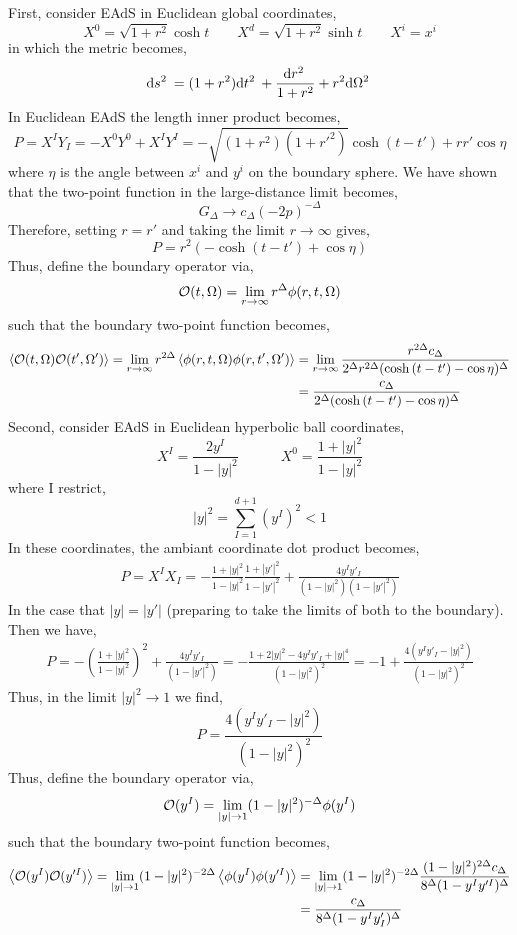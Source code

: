 \documentclass[12pt]{article}
\begin{document}
First, consider EAdS in Euclidean global coordinates,
\[ X^0 = \sqrt{1 + r^2} \cosh{t} \quad \quad X^d = \sqrt{1 + r^2} \sinh{t} \quad \quad X^i = x^i \]
in which the metric becomes,
\[ \mathrm{d}s^2 \: = (1 + r^2) \mathrm{d}t^2 \: + \frac{\mathrm{d}r^2 \:}{1 + r^2} + r^2 \mathrm{d}\Omega^2 \: \]
In Euclidean EAdS the length inner product becomes,
\[ P = X^I Y_I = - X^0 Y^0 + X^I Y^I = -\sqrt{(1 + r^2)(1 + r'^2)}  \cosh{(t - t')} + r r' \cos{\eta} \]
where $\eta$ is the angle between $x^i$ and $y^i$ on the boundary sphere.  
We have shown that the two-point function in the large-distance limit becomes,
\[ G_\Delta \to c_\Delta (-2 p)^{-\Delta} \]
Therefore, setting $r = r'$ and taking the limit $r \to \infty$ gives,
\[ P = r^2 \left( -\cosh{(t - t')} + \cos{\eta} \right) \]
Thus, define the boundary operator via,
\begin{align*}
\mathcal{O}(t, \Omega) = \lim_{r \to \infty} r^{\Delta} \phi(r, t, \Omega)
\end{align*}
such that the boundary two-point function becomes,
\begin{align*}
\left< \mathcal{O}(t, \Omega) \mathcal{O}(t', \Omega') \right> = \lim_{r \to \infty} r^{2\Delta} \left<  \phi(r, t, \Omega) \phi(r, t', \Omega') \right> & = \lim_{r \to \infty} \frac{r^{2\Delta} c_\Delta}{2^{\Delta} r^{2 \Delta} (\cosh{(t - t')} - \cos{\eta})^{\Delta}}
\\
& = \frac{c_\Delta}{2^\Delta (\cosh{(t - t')} - \cos{\eta})^{\Delta}} 
\end{align*}
Second, consider EAdS in Euclidean hyperbolic ball coordinates,
\[ X^I = \frac{2y^I}{1 - |y|^2} \quad \quad \quad X^0 = \frac{1 + |y|^2}{1 - |y|^2}  \]
where I restrict,
\[ |y|^2 = \sum_{I = 1}^{d + 1} (y^I)^2 < 1 \]
In these coordinates, the ambiant coordinate dot product becomes,
\begin{align*}
P = X^I X_I = -\frac{1 + |y|^2}{1 - |y|^2} \frac{1 + |y'|^2}{1 - |y'|^2}  + \frac{4 y^I y'_I}{(1 - |y|^2) (1 - |y'|^2)} 
\end{align*}
In the case that $|y| = |y'|$ (preparing to take the limits of both to the boundary). Then we have,
\begin{align*}
P = - \left( \frac{1 + |y|^2}{1 - |y|^2} \right)^2 + \frac{4 y^I y'_I}{(1 - |y'|^2)} = - \frac{1 +  2|y|^2 - 4 y^I y'_I + |y|^4}{(1 - |y|^2)^2} = - 1 + \frac{4 (y^I y'_I - |y|^2)}{(1 - |y|^2)^2}
\end{align*}
Thus, in the limit $|y|^2 \to 1$ we find,
\[ P = \frac{4 (y^I y'_I - |y|^2)}{(1 - |y|^2)^2} \]
Thus, define the boundary operator via,
\begin{align*}
\mathcal{O}(y^I) = \lim_{|y| \to 1} (1 - |y|^2)^{-\Delta} \phi(y^I)
\end{align*}
such that the boundary two-point function becomes,
\begin{align*}
\left< \mathcal{O}(y^I) \mathcal{O}(y'^I) \right> = \lim_{|y| \to 1} (1 - |y|^2)^{-2 \Delta} \left<  \phi(y^I) \phi(y'^I) \right> & = \lim_{|y| \to 1} (1 - |y|^2)^{-2 \Delta} \frac{(1 - |y|^2)^{2 \Delta} c_\Delta}{8^{\Delta} (1 - y^I y'^I)^{\Delta}}
\\
& = \frac{c_\Delta}{8^\Delta (1 - y^I y'_I)^{\Delta}}
\end{align*}
\end{document}
